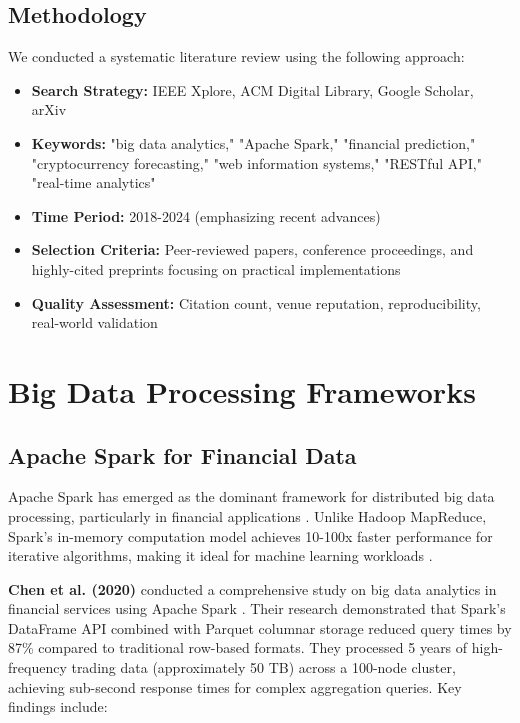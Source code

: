 \documentclass[conference]{IEEEtran}
\begin{document}
\subsection{Methodology}

We conducted a systematic literature review using the following approach:

\begin{itemize}
    \item \textbf{Search Strategy:} IEEE Xplore, ACM Digital Library, Google Scholar, arXiv
    \item \textbf{Keywords:} "big data analytics," "Apache Spark," "financial prediction," "cryptocurrency forecasting," "web information systems," "RESTful API," "real-time analytics"
    \item \textbf{Time Period:} 2018-2024 (emphasizing recent advances)
    \item \textbf{Selection Criteria:} Peer-reviewed papers, conference proceedings, and highly-cited preprints focusing on practical implementations
    \item \textbf{Quality Assessment:} Citation count, venue reputation, reproducibility, real-world validation
\end{itemize}

\section{Big Data Processing Frameworks}

\subsection{Apache Spark for Financial Data}

Apache Spark has emerged as the dominant framework for distributed big data processing, particularly in financial applications \cite{zaharia2016apache}. Unlike Hadoop MapReduce, Spark's in-memory computation model achieves 10-100x faster performance for iterative algorithms, making it ideal for machine learning workloads \cite{gandhi2019big}.

\textbf{Chen et al. (2020)} conducted a comprehensive study on big data analytics in financial services using Apache Spark \cite{chen2020big}. Their research demonstrated that Spark's DataFrame API combined with Parquet columnar storage reduced query times by 87\% compared to traditional row-based formats. They processed 5 years of high-frequency trading data (approximately 50 TB) across a 100-node cluster, achieving sub-second response times for complex aggregation queries. Key findings include:
\end{document}
